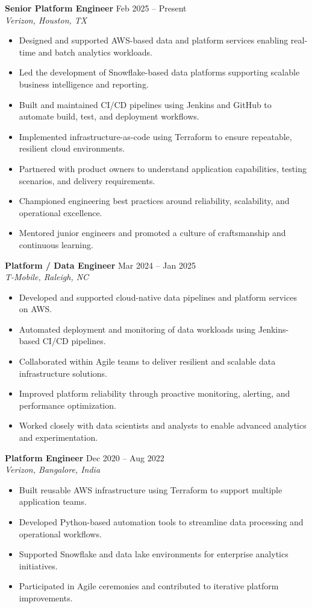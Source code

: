 \documentclass[10pt]{article}
\begin{document}
\textbf{Senior Platform Engineer} \hfill Feb 2025 -- Present \\
\textit{Verizon, Houston, TX}
\begin{itemize}[leftmargin=*, itemsep=3pt]
    \item Designed and supported AWS-based data and platform services enabling real-time and batch analytics workloads.
    \item Led the development of Snowflake-based data platforms supporting scalable business intelligence and reporting.
    \item Built and maintained CI/CD pipelines using Jenkins and GitHub to automate build, test, and deployment workflows.
    \item Implemented infrastructure-as-code using Terraform to ensure repeatable, resilient cloud environments.
    \item Partnered with product owners to understand application capabilities, testing scenarios, and delivery requirements.
    \item Championed engineering best practices around reliability, scalability, and operational excellence.
    \item Mentored junior engineers and promoted a culture of craftsmanship and continuous learning.
\end{itemize}

\textbf{Platform / Data Engineer} \hfill Mar 2024 -- Jan 2025 \\
\textit{T-Mobile, Raleigh, NC}
\begin{itemize}[leftmargin=*, itemsep=3pt]
    \item Developed and supported cloud-native data pipelines and platform services on AWS.
    \item Automated deployment and monitoring of data workloads using Jenkins-based CI/CD pipelines.
    \item Collaborated within Agile teams to deliver resilient and scalable data infrastructure solutions.
    \item Improved platform reliability through proactive monitoring, alerting, and performance optimization.
    \item Worked closely with data scientists and analysts to enable advanced analytics and experimentation.
\end{itemize}

\textbf{Platform Engineer} \hfill Dec 2020 -- Aug 2022 \\
\textit{Verizon, Bangalore, India}
\begin{itemize}[leftmargin=*, itemsep=3pt]
    \item Built reusable AWS infrastructure using Terraform to support multiple application teams.
    \item Developed Python-based automation tools to streamline data processing and operational workflows.
    \item Supported Snowflake and data lake environments for enterprise analytics initiatives.
    \item Participated in Agile ceremonies and contributed to iterative platform improvements.
\end{itemize}
\end{document}
